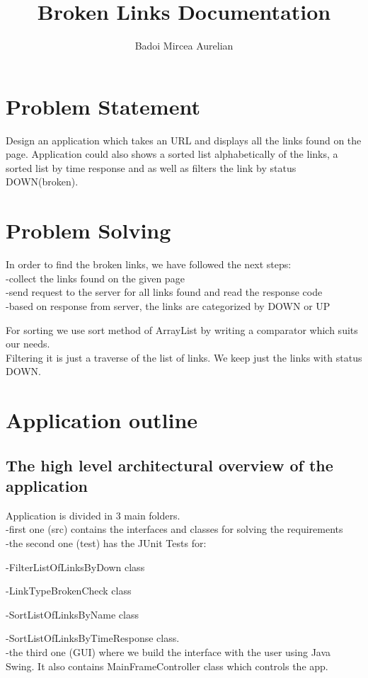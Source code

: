 \documentclass[11pt,leqno]{article}
\begin{document}
\pagestyle{plain}

\title{Broken Links Documentation}
\author{Badoi Mircea Aurelian}

\maketitle

\newpage

\section{Problem Statement}\label{sec_ps}
Design an application which takes an URL and displays all the links found on the page. Application could also shows a sorted list alphabetically of the links, a sorted list by time response and as well as filters the link by status DOWN(broken).
\vspace{20mm}

\section{Problem Solving}
In order to find the broken links, we have followed the next steps:\\
-collect the links found on the given page\\
-send request to the server for all links found and read the response code\\
-based on response from server, the links are categorized by DOWN or UP


\vspace{5mm}
For sorting we use sort method of ArrayList by writing a comparator which suits our needs.\\

\vspace{0.5mm}
Filtering it is just a traverse of the list of links. We keep just the links with status DOWN.
\newpage


\setlength{\parindent}{4em}
\section{Application outline}
\vspace{5mm}
\subsection{The high level architectural overview of the application}
Application is divided in 3 main folders.\\
-first one (src) contains the interfaces and classes for solving the requirements\\
-the second one (test) has the JUnit Tests for:\par 				-FilterListOfLinksByDown class\par 
-LinkTypeBrokenCheck class\par 
-SortListOfLinksByName class\par 
-SortListOfLinksByTimeResponse class.\\
-the third one (GUI) where we build the interface with the user using Java Swing. It also contains MainFrameController class which controls the app.  
\vspace{5mm}
\end{document}
